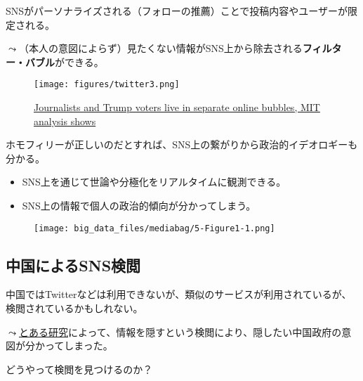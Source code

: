 \documentclass[
  xelatex,
  ja=standard]{bxjsarticle}
\providecommand{\tightlist}{%
  \setlength{\itemsep}{0pt}\setlength{\parskip}{0pt}}\usepackage{longtable,booktabs,array}
\begin{document}
SNSがパーソナライズされる（フォローの推薦）ことで投稿内容やユーザーが限定される。

\(\leadsto\)（本人の意図によらず）見たくない情報がSNS上から除去される\textbf{フィルター・バブル}ができる。

\begin{figure}[htpb]

{\centering \texttt{[image: figures/twitter3.png]}

}

\caption{\href{https://www.vice.com/en/article/d3xamx/journalists-and-trump-voters-live-in-separate-online-bubbles-mit-analysis-shows}{Journalists
and Trump voters live in separate online bubbles, MIT analysis shows}}

\end{figure}

ホモフィリーが正しいのだとすれば、SNS上の繋がりから政治的イデオロギーも分かる。

\begin{itemize}
\tightlist
\item
  SNS上を通じて世論や分極化をリアルタイムに観測できる。
\item
  SNS上の情報で個人の政治的傾向が分かってしまう。
\end{itemize}

\begin{figure}[htpb]

{\centering \texttt{[image: big\_data\_files/mediabag/5-Figure1-1.png]}

}

\caption{\citet{barbera2015}}

\end{figure}

\hypertarget{ux4e2dux56fdux306bux3088ux308bsnsux691cux95b2}{%
\subsection{中国によるSNS検閲}\label{ux4e2dux56fdux306bux3088ux308bsnsux691cux95b2}}

中国ではTwitterなどは利用できないが、類似のサービスが利用されているが、検閲されているかもしれない。

\(\leadsto\)\href{https://ipsj.ixsq.nii.ac.jp/ej/?action=pages_view_main\&active_action=repository_view_main_item_detail\&item_id=199708\&item_no=1\&page_id=13\&block_id=8}{とある研究}によって、情報を隠すという検閲により、隠したい中国政府の意図が分かってしまった。

どうやって検閲を見つけるのか？
\end{document}
